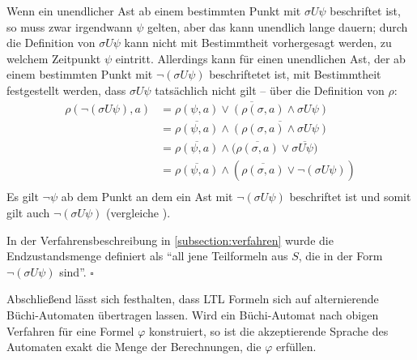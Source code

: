 Wenn ein unendlicher Ast ab einem bestimmten Punkt mit $\sigma U\psi$ beschriftet ist, so muss zwar irgendwann $\psi$ gelten, aber das kann unendlich lange dauern; durch die Definition von $\sigma U\psi$ kann nicht mit Bestimmtheit vorhergesagt werden, zu welchem Zeitpunkt $\psi$ eintritt. Allerdings kann für einen unendlichen Ast, der ab einem bestimmten Punkt mit $\lnot(\sigma U\psi)$ beschriftetet ist, mit Bestimmtheit festgestellt werden, dass $\sigma U\psi$ tatsächlich nicht gilt -- über die Definition von $\rho$:
\begin{equation}
\begin{split}
    \rho(\lnot(\sigma U\psi), a) &= \overline{\rho(\psi, a) \lor (\rho(\sigma, a) \land \sigma U\psi)}\\
    &= \overline{\rho(\psi, a)} \land \overline{(\rho(\sigma, a) \land \sigma U\psi)}\\
    &= \overline{\rho(\psi, a)} \land (\overline{\rho(\sigma, a)} \lor \overline{\sigma U\psi)}\\
    &= \overline{\rho(\psi, a)} \land (\overline{\rho(\sigma, a)} \lor \lnot(\sigma U\psi))\\
\end{split}
\end{equation}
Es gilt $\lnot\psi$ ab dem Punkt an dem ein Ast mit $\lnot(\sigma U\psi)$ beschriftet ist und somit gilt auch $\lnot(\sigma U\psi)$ (vergleiche \cite{vardi+96}).

In der Verfahrensbeschreibung in \ref{subsection:verfahren} wurde die Endzustandsmenge definiert als "`all jene Teilformeln aus $S$, die in der Form $\lnot(\sigma U\psi)$ sind"'. $\square$

Abschließend lässt sich festhalten, dass LTL Formeln sich auf alternierende Büchi-Automaten übertragen lassen. Wird ein Büchi-Automat nach obigen Verfahren für eine Formel $\varphi$ konstruiert, so ist die akzeptierende Sprache des Automaten exakt die Menge der Berechnungen, die $\varphi$ erfüllen.